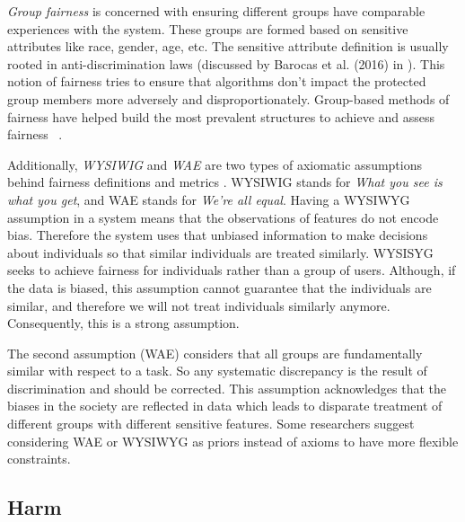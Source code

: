         \textit{Group fairness} is concerned with ensuring different groups have comparable experiences with the system. These groups are formed based on sensitive attributes like race, gender, age, etc. The sensitive attribute definition is usually rooted in anti-discrimination laws (discussed by Barocas et al. (2016) in \cite{barocas2016big}). This notion of fairness tries to ensure that algorithms don't impact the protected group members more adversely and disproportionately. Group-based methods of fairness have helped build the most prevalent structures to achieve and assess fairness ~\cite{zemel2013learning,kamishima2012fairness,kamiran2010discrimination,zhang2017anti}.
        
        Additionally, \textit{WYSIWIG} and \textit{WAE} are two types of axiomatic assumptions behind fairness definitions and metrics \cite{friedler-impossibility-2021}. WYSIWIG stands for \textit{What you see is what you get}, and WAE stands for \textit{We're all equal}. Having a WYSIWYG assumption in a system means that the observations of features do not encode bias. Therefore the system uses that unbiased information to make decisions about individuals so that similar individuals are treated similarly. WYSISYG seeks to achieve fairness for individuals rather than a group of users. Although, if the data is biased, this assumption cannot guarantee that the individuals are similar, and therefore we will not treat individuals similarly anymore. Consequently, this is a strong assumption. 
        
        The second assumption (WAE) considers that all groups are fundamentally similar with respect to a task. So any systematic discrepancy is the result of discrimination and should be corrected. This assumption acknowledges that the biases in the society are reflected in data which leads to disparate treatment of different groups with different sensitive features. Some researchers suggest considering WAE or WYSIWYG as priors instead of axioms to have more flexible constraints.
        
        
     
    \subsection{Harm}
    
